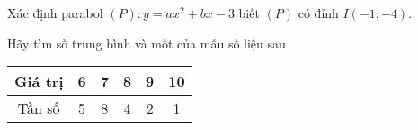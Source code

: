 \begin{bt}%
	Xác định parabol $(P): y=ax^2+bx-3$ biết $(P)$ có đỉnh $I(-1;-4)$.\\
\end{bt}
\begin{bt}%
	Hãy tìm số trung bình và mốt của mẫu số liệu sau
	\begin{center}
		\begin{tabular}{|c|c|c|c|c|c|}
			\hline Giá trị & 6 & 7 & 8 & 9 & 10 \\
			\hline Tần số & 5 & 8 & 4 & 2 & 1 \\
			\hline
		\end{tabular}
	\end{center}

\end{bt} 


